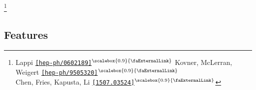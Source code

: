 \documentclass[aspectratio=169,11pt,usenames,dvipsnames]{beamer}
\renewcommand{\thefootnote}{\color{customblue}\faPaperPlaneO}
\newcommand\blfootnote[1]{%
  \begingroup
  \renewcommand\thefootnote{}\footnote{#1}%
  \addtocounter{footnote}{-1}%
  \endgroup
}
\begin{document}
\begin{frame}
    \vspace{-10pt}
    \blfootnote{\scriptsize Lappi \href{https://arxiv.org/abs/hep-ph/0602189}{{\color{palgold}\texttt{[hep-ph/0602189]}$^\text{\scalebox{0.9}{\faExternalLink}}$}} Kovner, McLerran, Weigert \href{https://arxiv.org/abs/hep-ph/9505320}{{\color{palgold}\texttt{[hep-ph/9505320]}$^\text{\scalebox{0.9}{\faExternalLink}}$}}\\
    \hspace{13.5pt} Chen, Fries, Kapusta, Li \href{https://arxiv.org/abs/1507.03524}{{\color{palgold}\texttt{[1507.03524]}$^\text{\scalebox{0.9}{\faExternalLink}}$}} }
\end{frame}



\subsection{Features}

\end{document}
